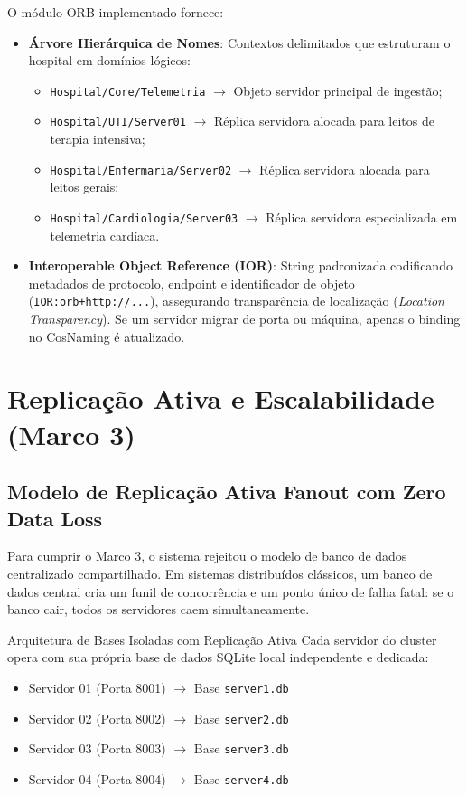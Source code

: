 \documentclass[11pt,a4paper]{article}
\begin{document}
O módulo ORB implementado fornece:
\begin{itemize}
    \item \textbf{Árvore Hierárquica de Nomes}: Contextos delimitados que estruturam o hospital em domínios lógicos:
    \begin{itemize}
        \item \texttt{Hospital/Core/Telemetria} $\to$ Objeto servidor principal de ingestão;
        \item \texttt{Hospital/UTI/Server01} $\to$ Réplica servidora alocada para leitos de terapia intensiva;
        \item \texttt{Hospital/Enfermaria/Server02} $\to$ Réplica servidora alocada para leitos gerais;
        \item \texttt{Hospital/Cardiologia/Server03} $\to$ Réplica servidora especializada em telemetria cardíaca.
    \end{itemize}
    \item \textbf{Interoperable Object Reference (IOR)}: String padronizada codificando metadados de protocolo, endpoint e identificador de objeto (\texttt{IOR:orb+http://...}), assegurando transparência de localização (\textit{Location Transparency}). Se um servidor migrar de porta ou máquina, apenas o binding no CosNaming é atualizado.
\end{itemize}

\section{Replicação Ativa e Escalabilidade (Marco 3)}

\subsection{Modelo de Replicação Ativa Fanout com Zero Data Loss}
Para cumprir o Marco 3, o sistema rejeitou o modelo de banco de dados centralizado compartilhado. Em sistemas distribuídos clássicos, um banco de dados central cria um funil de concorrência e um ponto único de falha fatal: se o banco cair, todos os servidores caem simultaneamente.

\begin{destaque}{Arquitetura de Bases Isoladas com Replicação Ativa}
Cada servidor do cluster opera com sua própria base de dados SQLite local independente e dedicada:
\begin{itemize}
    \item Servidor 01 (Porta 8001) $\to$ Base \texttt{server1.db}
    \item Servidor 02 (Porta 8002) $\to$ Base \texttt{server2.db}
    \item Servidor 03 (Porta 8003) $\to$ Base \texttt{server3.db}
    \item Servidor 04 (Porta 8004) $\to$ Base \texttt{server4.db}
\end{itemize}
\end{destaque}
\end{document}
